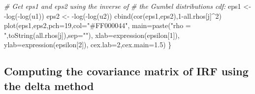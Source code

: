 \documentclass[
  12pt,
]{book}
\newenvironment{Shaded}{\begin{snugshade}}{\end{snugshade}}
\newcommand{\AttributeTok}[1]{\textcolor[rgb]{0.77,0.63,0.00}{#1}}
\newcommand{\CommentTok}[1]{\textcolor[rgb]{0.56,0.35,0.01}{\textit{#1}}}
\newcommand{\DecValTok}[1]{\textcolor[rgb]{0.00,0.00,0.81}{#1}}
\newcommand{\FloatTok}[1]{\textcolor[rgb]{0.00,0.00,0.81}{#1}}
\newcommand{\FunctionTok}[1]{\textcolor[rgb]{0.00,0.00,0.00}{#1}}
\newcommand{\NormalTok}[1]{#1}
\newcommand{\OtherTok}[1]{\textcolor[rgb]{0.56,0.35,0.01}{#1}}
\newcommand{\SpecialCharTok}[1]{\textcolor[rgb]{0.00,0.00,0.00}{#1}}
\newcommand{\StringTok}[1]{\textcolor[rgb]{0.31,0.60,0.02}{#1}}
\theoremstyle{definition}
\theoremstyle{definition}
\theoremstyle{definition}
\theoremstyle{definition}
\theoremstyle{remark}
\begin{document}
\begin{Shaded}
\begin{Highlighting}[]
  \CommentTok{\# Get eps1 and eps2 using the inverse of}
  \CommentTok{\# the Gumbel distribution\textquotesingle{}s cdf:}
\NormalTok{  eps1 }\OtherTok{\textless{}{-}} \SpecialCharTok{{-}}\FunctionTok{log}\NormalTok{(}\SpecialCharTok{{-}}\FunctionTok{log}\NormalTok{(u1))}
\NormalTok{  eps2 }\OtherTok{\textless{}{-}} \SpecialCharTok{{-}}\FunctionTok{log}\NormalTok{(}\SpecialCharTok{{-}}\FunctionTok{log}\NormalTok{(u2))}
  \FunctionTok{cbind}\NormalTok{(}\FunctionTok{cor}\NormalTok{(eps1,eps2),}\DecValTok{1}\SpecialCharTok{{-}}\NormalTok{all.rhos[j]}\SpecialCharTok{\^{}}\DecValTok{2}\NormalTok{)}
  \FunctionTok{plot}\NormalTok{(eps1,eps2,}\AttributeTok{pch=}\DecValTok{19}\NormalTok{,}\AttributeTok{col=}\StringTok{"\#FF000044"}\NormalTok{,}
       \AttributeTok{main=}\FunctionTok{paste}\NormalTok{(}\StringTok{"rho = "}\NormalTok{,}\FunctionTok{toString}\NormalTok{(all.rhos[j]),}\AttributeTok{sep=}\StringTok{""}\NormalTok{),}
       \AttributeTok{xlab=}\FunctionTok{expression}\NormalTok{(epsilon[}\DecValTok{1}\NormalTok{]),}
       \AttributeTok{ylab=}\FunctionTok{expression}\NormalTok{(epsilon[}\DecValTok{2}\NormalTok{]),}
       \AttributeTok{cex.lab=}\DecValTok{2}\NormalTok{,}\AttributeTok{cex.main=}\FloatTok{1.5}\NormalTok{)}
\NormalTok{\}}
\end{Highlighting}
\end{Shaded}

\hypertarget{IRFDELTA}{%
\subsection{Computing the covariance matrix of IRF using the delta method}\label{IRFDELTA}}
\end{document}
